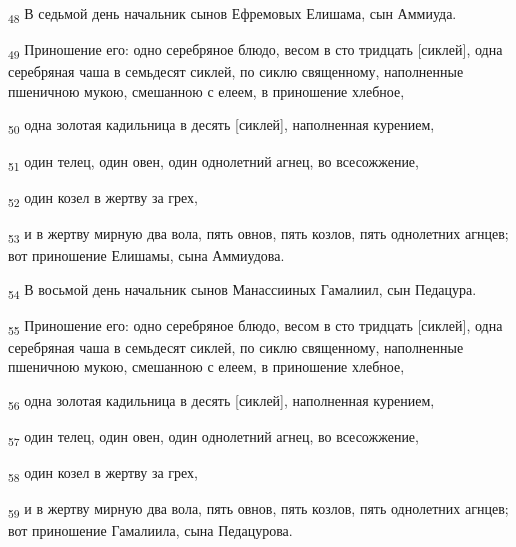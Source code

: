 \begin{tcolorbox}
\textsubscript{48} В седьмой день начальник сынов Ефремовых Елишама, сын Аммиуда.
\end{tcolorbox}
\begin{tcolorbox}
\textsubscript{49} Приношение его: одно серебряное блюдо, весом в сто тридцать [сиклей], одна серебряная чаша в семьдесят сиклей, по сиклю священному, наполненные пшеничною мукою, смешанною с елеем, в приношение хлебное,
\end{tcolorbox}
\begin{tcolorbox}
\textsubscript{50} одна золотая кадильница в десять [сиклей], наполненная курением,
\end{tcolorbox}
\begin{tcolorbox}
\textsubscript{51} один телец, один овен, один однолетний агнец, во всесожжение,
\end{tcolorbox}
\begin{tcolorbox}
\textsubscript{52} один козел в жертву за грех,
\end{tcolorbox}
\begin{tcolorbox}
\textsubscript{53} и в жертву мирную два вола, пять овнов, пять козлов, пять однолетних агнцев; вот приношение Елишамы, сына Аммиудова.
\end{tcolorbox}
\begin{tcolorbox}
\textsubscript{54} В восьмой день начальник сынов Манассииных Гамалиил, сын Педацура.
\end{tcolorbox}
\begin{tcolorbox}
\textsubscript{55} Приношение его: одно серебряное блюдо, весом в сто тридцать [сиклей], одна серебряная чаша в семьдесят сиклей, по сиклю священному, наполненные пшеничною мукою, смешанною с елеем, в приношение хлебное,
\end{tcolorbox}
\begin{tcolorbox}
\textsubscript{56} одна золотая кадильница в десять [сиклей], наполненная курением,
\end{tcolorbox}
\begin{tcolorbox}
\textsubscript{57} один телец, один овен, один однолетний агнец, во всесожжение,
\end{tcolorbox}
\begin{tcolorbox}
\textsubscript{58} один козел в жертву за грех,
\end{tcolorbox}
\begin{tcolorbox}
\textsubscript{59} и в жертву мирную два вола, пять овнов, пять козлов, пять однолетних агнцев; вот приношение Гамалиила, сына Педацурова.
\end{tcolorbox}
